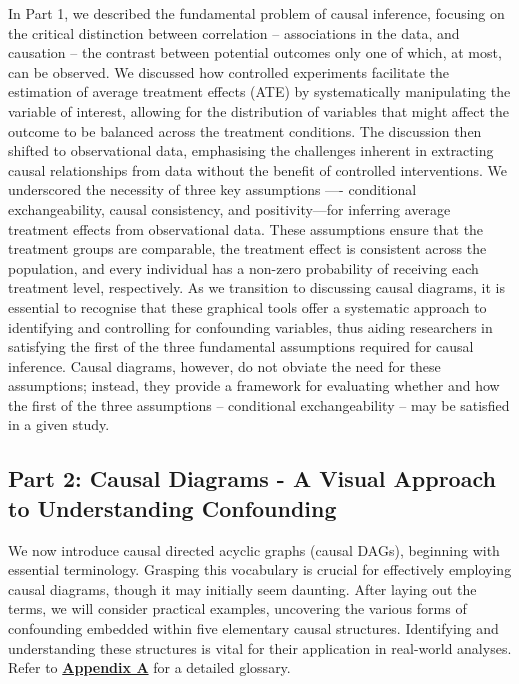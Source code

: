 \documentclass[
  singlecolumn]{article}
\begin{document}
In Part 1, we described the fundamental problem of causal inference,
focusing on the critical distinction between correlation -- associations
in the data, and causation -- the contrast between potential outcomes
only one of which, at most, can be observed. We discussed how controlled
experiments facilitate the estimation of average treatment effects (ATE)
by systematically manipulating the variable of interest, allowing for
the distribution of variables that might affect the outcome to be
balanced across the treatment conditions. The discussion then shifted to
observational data, emphasising the challenges inherent in extracting
causal relationships from data without the benefit of controlled
interventions. We underscored the necessity of three key assumptions
---- conditional exchangeability, causal consistency, and
positivity---for inferring average treatment effects from observational
data. These assumptions ensure that the treatment groups are comparable,
the treatment effect is consistent across the population, and every
individual has a non-zero probability of receiving each treatment level,
respectively. As we transition to discussing causal diagrams, it is
essential to recognise that these graphical tools offer a systematic
approach to identifying and controlling for confounding variables, thus
aiding researchers in satisfying the first of the three fundamental
assumptions required for causal inference. Causal diagrams, however, do
not obviate the need for these assumptions; instead, they provide a
framework for evaluating whether and how the first of the three
assumptions -- conditional exchangeability -- may be satisfied in a
given study.

\subsection{Part 2: Causal Diagrams - A Visual Approach to Understanding
Confounding}\label{section-part2}

We now introduce causal directed acyclic graphs (causal DAGs), beginning
with essential terminology. Grasping this vocabulary is crucial for
effectively employing causal diagrams, though it may initially seem
daunting. After laying out the terms, we will consider practical
examples, uncovering the various forms of confounding embedded within
five elementary causal structures. Identifying and understanding these
structures is vital for their application in real-world analyses. Refer
to \hyperref[appendix-a]{\textbf{Appendix A}} for a detailed glossary.
\end{document}

